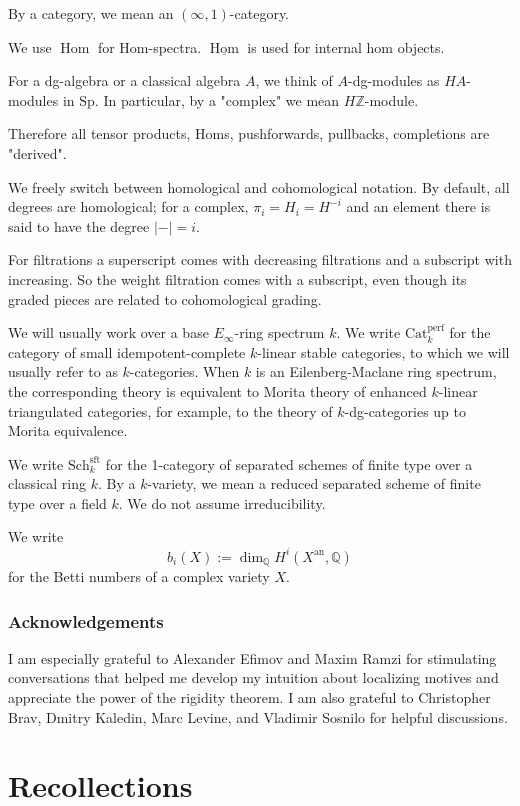 \documentclass{amsart}
\theoremstyle{plain}
\theoremstyle{definition}
\newcommand{\bbQ}{\mathbb{Q}}
\newcommand{\bbZ}{\mathbb{Z}}
\newcommand{\Catperf}{\mathrm{Cat}^{\mathrm{perf}}}
\newcommand{\Sp}{\mathrm{Sp}}
\newcommand{\Sch}{\mathrm{Sch}}
\DeclareMathOperator{\Hom}{Hom}
\newcommand{\an}{\mathrm{an}}
\newcommand{\sft}{\mathrm{sft}}
\begin{document}
By a category, we mean an $(\infty,1)$-category.

We use $\Hom$ for Hom-spectra. $\underline{\Hom}$ is used for internal hom objects.

For a dg-algebra or a classical algebra $A$, we think of $A$-dg-modules as $HA$-modules in $\Sp$. In particular, by a "complex" we mean $H\bbZ$-module.

Therefore all tensor products, Homs, pushforwards, pullbacks, completions are "derived".

We freely switch between homological and cohomological notation. By default, all degrees are  homological; for a complex, $\pi_i=H_i=H^{-i}$ and an element there is said to have the degree $|-|=i$. 

For filtrations a superscript comes with decreasing filtrations and a subscript with increasing. So the weight filtration comes with a subscript, even though its graded pieces are related to cohomological grading.


We will usually work over a base $E_\infty$-ring spectrum $k$. We write $\Catperf_k$ for the  category of small idempotent-complete $k$-linear stable  categories, to which we will usually refer to as $k$-categories. When $k$ is an Eilenberg-Maclane ring spectrum, the corresponding theory is equivalent to Morita theory of enhanced $k$-linear triangulated categories, for example, to the theory of $k$-dg-categories up to Morita equivalence. 


We write $\Sch^\sft_k$ for the 1-category of separated schemes of finite type over a classical ring $k$. By a $k$-variety, we mean a reduced separated scheme of finite type over a field $k$. We do not assume irreducibility.

We write
\[
b_i(X):=\dim_{\bbQ}H^i(X^\an,\bbQ)
\]
for the Betti numbers of a complex variety $X$.


\subsubsection*{Acknowledgements}

I am especially grateful to Alexander Efimov and Maxim Ramzi for stimulating conversations that helped me develop my intuition about localizing motives and appreciate the power of the rigidity theorem. I am also grateful to Christopher Brav, Dmitry Kaledin, Marc Levine, and Vladimir Sosnilo for helpful discussions.

\medskip

\section{Recollections}
\end{document}
